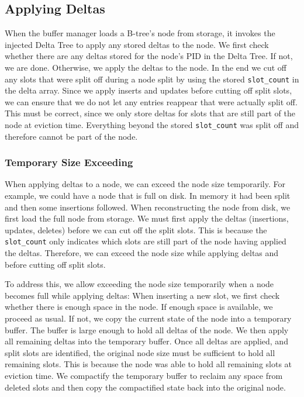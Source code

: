 \subsection*{Applying Deltas}
When the buffer manager loads a B-tree's node from storage, it invokes the injected Delta Tree to apply any stored deltas to the node.
We first check whether there are any deltas stored for the node's \ac{PID} in the Delta Tree.
If not, we are done.
Otherwise, we apply the deltas to the node.
In the end we cut off any slots that were split off during a node split by using the stored \texttt{slot\_count} in the delta array.
Since we apply inserts and updates before cutting off split slots, we can ensure that we do not let any entries reappear that were actually split off. 
This must be correct, since we only store deltas for slots that are still part of the node at eviction time.
Everything beyond the stored \texttt{slot\_count} was split off and therefore cannot be part of the node.

\subsubsection*{Temporary Size Exceeding}
When applying deltas to a node, we can exceed the node size temporarily.
For example, we could have a node that is full on disk. 
In memory it had been split and then some insertions followed. 
When reconstructing the node from disk, we first load the full node from storage.
We must first apply the deltas (insertions, updates, deletes) before we can cut off the split slots.
This is because the \texttt{slot\_count} only indicates which slots are still part of the node having applied the deltas.
Therefore, we can exceed the node size while applying deltas and before cutting off split slots.

To address this, we allow exceeding the node size temporarily when a node becomes full while applying deltas:
When inserting a new slot, we first check whether there is enough space in the node.
If enough space is available, we proceed as usual.
If not, we copy the current state of the node into a temporary buffer.
The buffer is large enough to hold all deltas of the node.
We then apply all remaining deltas into the temporary buffer.
Once all deltas are applied, and split slots are identified, the original node size must be sufficient to hold all remaining slots.
This is because the node was able to hold all remaining slots at eviction time.
We compactify the temporary buffer to reclaim any space from deleted slots and then copy the compactified state back into the original node.

